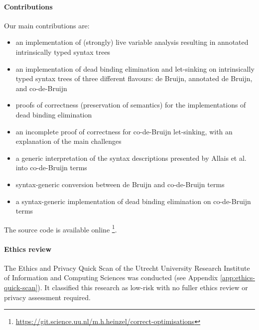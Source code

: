   \paragraph{Contributions}
    Our main contributions are:
    \begin{itemize}
      \item an implementation of (strongly) live variable analysis resulting in annotated intrinsically typed syntax trees
      \item an implementation of dead binding elimination and let-sinking on intrinsically typed syntax trees of three different flavours: de Bruijn, annotated de Bruijn, and co-de-Bruijn
      \item proofs of correctness (preservation of semantics) for the implementations of dead binding elimination
      \item an incomplete proof of correctness for co-de-Bruijn let-sinking, with an explanation of the main challenges
      \item a generic interpretation of the syntax descriptions presented by Allais et al. \cite{Allais2018UniverseOfSyntaxes} into co-de-Bruijn terms
      \item syntax-generic conversion between de Bruijn and co-de-Bruijn terms
      \item a syntax-generic implementation of dead binding elimination on co-de-Bruijn terms
    \end{itemize}
    The source code is available online%
    \footnote{\url{https://git.science.uu.nl/m.h.heinzel/correct-optimisations}}.

  \paragraph{Ethics review}
    The Ethics and Privacy Quick Scan of the Utrecht University Research Institute of Information and Computing Sciences was conducted (see Appendix \ref{app:ethics-quick-scan}).
    It classified this research as low-risk with no fuller ethics review or privacy assessment required.
